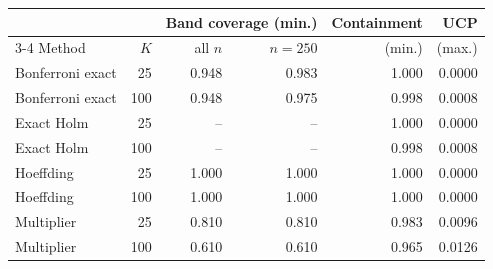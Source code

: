 \begin{tabular}{lrrrrr}
\toprule
 & & \multicolumn{2}{c}{Band coverage (min.)} & Containment & UCP \\
\cmidrule(lr){3-4}
Method & $K$ & all $n$ & $n=250$ & (min.) & (max.) \\
\midrule
Bonferroni exact & 25 & 0.948 & 0.983 & 1.000 & 0.0000 \\
Bonferroni exact & 100 & 0.948 & 0.975 & 0.998 & 0.0008 \\
Exact Holm & 25 & -- & -- & 1.000 & 0.0000 \\
Exact Holm & 100 & -- & -- & 0.998 & 0.0008 \\
Hoeffding & 25 & 1.000 & 1.000 & 1.000 & 0.0000 \\
Hoeffding & 100 & 1.000 & 1.000 & 1.000 & 0.0000 \\
Multiplier & 25 & 0.810 & 0.810 & 0.983 & 0.0096 \\
Multiplier & 100 & 0.610 & 0.610 & 0.965 & 0.0126 \\
\bottomrule
\end{tabular}
